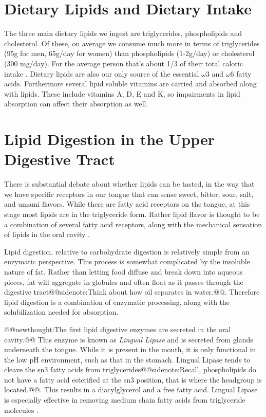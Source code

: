 \documentclass{tufte-handout}
\makeatletter
\def\newthought#1{@@newthought:#1@@}
\def\sidenote#1{@@sidenote:#1@@}
\makeatother
\begin{document}
\section{Dietary Lipids and Dietary Intake}

The three main dietary lipids we ingest are triglycerides, phospholipids and cholesterol.  Of these, on average we consume much more in terms of triglycerides (95g for men, 65g/day for women) than phospholipids (1-2g/day) or cholesterol (300 mg/day).  For the average person that's about 1/3 of their total caloric intake \citep{NationalCenterforHealthStatistics2017}.  Dietary lipids are also our only source of the essential $\omega$3 and $\omega$6 fatty acids.  Furthermore several lipid soluble vitamins are carried and absorbed along with lipids.  These include vitamins A, D, E and K, so impairments in lipid absorption can affect their absorption as well.

\section{Lipid Digestion in the Upper Digestive Tract}

There is substantial debate about whether lipids can be tasted, in the way that we have specific receptors in our tongue that can sense sweet, bitter, sour, salt, and umami flavors.  While there are fatty acid receptors on the tongue, at this stage most lipids are in the triglyceride form.  Rather lipid flavor is thought to be a combination of several fatty acid receptors, along with the mechanical sensation of lipids in the oral cavity \citep{DiPatrizio2014}.

Lipid digestion, relative to carbohydrate digestion is relatively simple from an enzymatic perspective.  This process is somewhat complicated by the insoluble nature of fat.  Rather than letting food diffuse and break down into aqueous pieces, fat will aggregate in globules and often float as it passes through the digestive tract\sidenote{Think about how oil separates in water.}.  Therefore lipid digestion is a combination of enzymatic processing, along with the solubilization needed for absorption.

\newthought{The first lipid digestive enzymes are secreted in the oral cavity.}  This enzyme is known as \emph{Lingual Lipase} and is secreted from glands underneath the tongue.  While it is present in the mouth, it is only functional in the low pH environment, such as that in the stomach.  Lingual Lipase tends to cleave the sn3 fatty acids from triglycerides\sidenote{Recall, phospholipids do not have a fatty acid esterified at the sn3 position, that is where the headgroup is located.}.  This results in a diacylglycerol and a free fatty acid. Lingual Lipase is especially effective in removing medium chain fatty acids from triglyceride molecules \citep{Jensen1983}.
\end{document}
